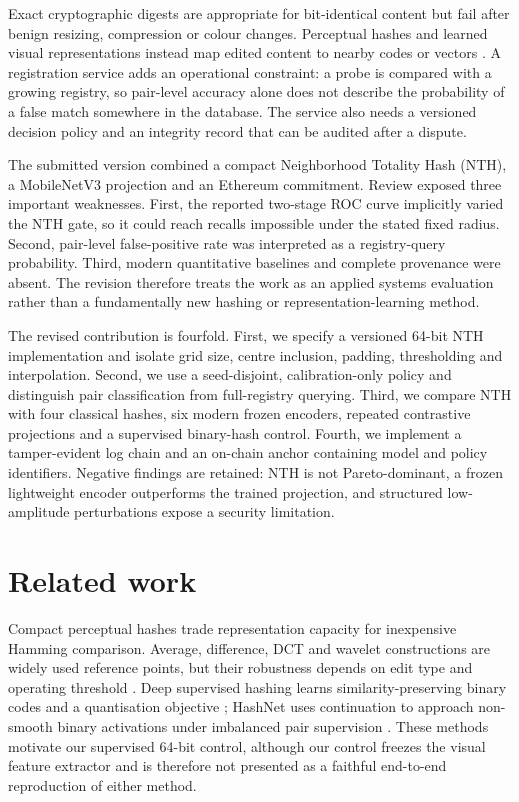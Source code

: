 \documentclass[12pt]{article}
\begin{document}
Exact cryptographic digests are appropriate for bit-identical content but fail after benign resizing, compression or colour changes. Perceptual hashes and learned visual representations instead map edited content to nearby codes or vectors \cite{monga2006perceptual,farid2021overview}. A registration service adds an operational constraint: a probe is compared with a growing registry, so pair-level accuracy alone does not describe the probability of a false match somewhere in the database. The service also needs a versioned decision policy and an integrity record that can be audited after a dispute.

\color{revisionred}
The submitted version combined a compact Neighborhood Totality Hash (NTH), a MobileNetV3 projection and an Ethereum commitment. Review exposed three important weaknesses. First, the reported two-stage ROC curve implicitly varied the NTH gate, so it could reach recalls impossible under the stated fixed radius. Second, pair-level false-positive rate was interpreted as a registry-query probability. Third, modern quantitative baselines and complete provenance were absent. The revision therefore treats the work as an applied systems evaluation rather than a fundamentally new hashing or representation-learning method.

The revised contribution is fourfold. First, we specify a versioned 64-bit NTH implementation and isolate grid size, centre inclusion, padding, thresholding and interpolation. Second, we use a seed-disjoint, calibration-only policy and distinguish pair classification from full-registry querying. Third, we compare NTH with four classical hashes, six modern frozen encoders, repeated contrastive projections and a supervised binary-hash control. Fourth, we implement a tamper-evident log chain and an on-chain anchor containing model and policy identifiers. Negative findings are retained: NTH is not Pareto-dominant, a frozen lightweight encoder outperforms the trained projection, and structured low-amplitude perturbations expose a security limitation.
\color{black}

\section{Related work}
\color{revisionred}

Compact perceptual hashes trade representation capacity for inexpensive Hamming comparison. Average, difference, DCT and wavelet constructions are widely used reference points, but their robustness depends on edit type and operating threshold \cite{monga2006perceptual,farid2021overview}. Deep supervised hashing learns similarity-preserving binary codes and a quantisation objective \cite{liu2016dsh}; HashNet uses continuation to approach non-smooth binary activations under imbalanced pair supervision \cite{cao2017hashnet}. These methods motivate our supervised 64-bit control, although our control freezes the visual feature extractor and is therefore not presented as a faithful end-to-end reproduction of either method.
\end{document}
